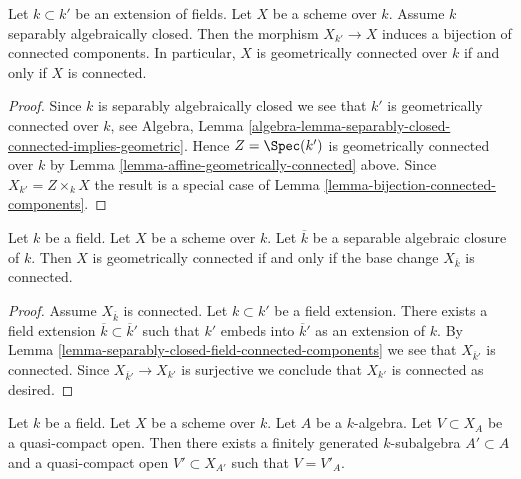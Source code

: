 \begin{lemma}
\label{lemma-separably-closed-field-connected-components}
Let $k \subset k'$ be an extension of fields.
Let $X$ be a scheme over $k$.
Assume $k$ separably algebraically closed.
Then the morphism $X_{k'} \to X$ induces a bijection of connected
components. In particular, $X$ is geometrically connected over $k$
if and only if $X$ is connected.
\end{lemma}

\begin{proof}
Since $k$ is separably algebraically closed we see that
$k'$ is geometrically connected over $k$, see
Algebra,
Lemma \ref{algebra-lemma-separably-closed-connected-implies-geometric}.
Hence $Z = \Spec(k')$ is geometrically connected over $k$ by
Lemma \ref{lemma-affine-geometrically-connected}
above. Since $X_{k'} = Z \times_k X$ the result is a special case of
Lemma \ref{lemma-bijection-connected-components}.
\end{proof}

\begin{lemma}
\label{lemma-characterize-geometrically-connected}
Let $k$ be a field.
Let $X$ be a scheme over $k$.
Let $\overline{k}$ be a separable algebraic closure of $k$.
Then $X$ is geometrically connected if and only if the base change
$X_{\overline{k}}$ is connected.
\end{lemma}

\begin{proof}
Assume $X_{\overline{k}}$ is connected.
Let $k \subset k'$ be a field extension.
There exists a field extension $\overline{k} \subset \overline{k}'$
such that $k'$ embeds into $\overline{k}'$ as an extension of $k$.
By Lemma \ref{lemma-separably-closed-field-connected-components}
we see that $X_{\overline{k}'}$ is connected.
Since $X_{\overline{k}'} \to X_{k'}$ is surjective we conclude
that $X_{k'}$ is connected as desired.
\end{proof}

\begin{lemma}
\label{lemma-descend-open}
Let $k$ be a field.
Let $X$ be a scheme over $k$.
Let $A$ be a $k$-algebra.
Let $V \subset X_A$ be a quasi-compact open.
Then there exists a finitely generated $k$-subalgebra $A' \subset A$
and a quasi-compact open $V' \subset X_{A'}$
such that $V = V'_A$.
\end{lemma}

